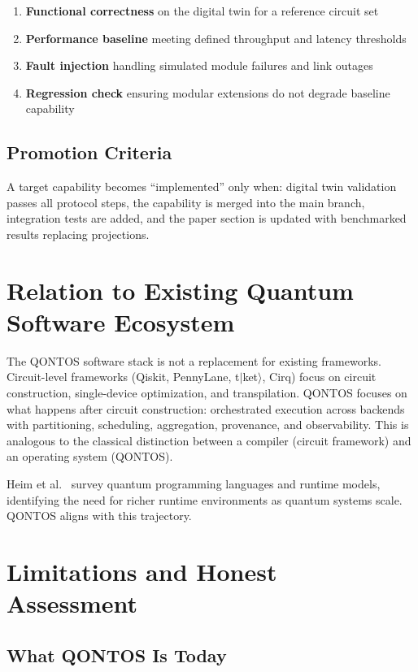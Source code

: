 \documentclass[conference]{IEEEtran}
\begin{document}
\begin{enumerate}
\item \textbf{Functional correctness} on the digital twin for a reference circuit set
\item \textbf{Performance baseline} meeting defined throughput and latency thresholds
\item \textbf{Fault injection} handling simulated module failures and link outages
\item \textbf{Regression check} ensuring modular extensions do not degrade baseline capability
\end{enumerate}

\subsection{Promotion Criteria}

A target capability becomes ``implemented'' only when: digital twin validation passes all protocol steps, the capability is merged into the main branch, integration tests are added, and the paper section is updated with benchmarked results replacing projections.

\section{Relation to Existing Quantum Software Ecosystem}

The QONTOS software stack is not a replacement for existing frameworks. Circuit-level frameworks (Qiskit, PennyLane, t$|$ket$\rangle$, Cirq) focus on circuit construction, single-device optimization, and transpilation. QONTOS focuses on what happens after circuit construction: orchestrated execution across backends with partitioning, scheduling, aggregation, provenance, and observability. This is analogous to the classical distinction between a compiler (circuit framework) and an operating system (QONTOS).

Heim et al.~\cite{Heim2020} survey quantum programming languages and runtime models, identifying the need for richer runtime environments as quantum systems scale. QONTOS aligns with this trajectory.

\section{Limitations and Honest Assessment}

\subsection{What QONTOS Is Today}
\end{document}
